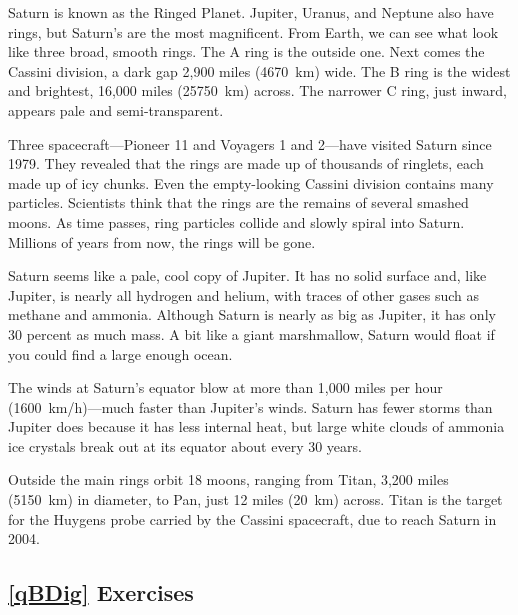 \documentclass{article}
\numberwithin{equation}{section}
\numberwithin{figure}{section}
\begin{document}
\begin{displayquote}
    Saturn is known as the Ringed Planet. Jupiter, Uranus, and Neptune also have rings, but Saturn's are the most magnificent. From Earth, we can see what look like three broad, smooth rings. The A ring is the outside one. Next comes the Cassini division, a dark gap 2,900 miles (\SI{4670}{km}) wide. The B ring is the widest and brightest, 16,000 miles (\SI{25750}{km}) across. The narrower C ring, just inward, appears pale and semi-transparent. 

    \vspace{1em}

    Three spacecraft---Pioneer 11 and Voyagers 1 and 2---have visited Saturn since 1979. They revealed that the rings are made up of thousands of ringlets, each made up of icy chunks. Even the empty-looking Cassini division contains many particles. Scientists think that the rings are the remains of several smashed moons. As time passes, ring particles collide and slowly spiral into Saturn. Millions of years from now, the rings will be gone.

    \vspace{1em}

    Saturn seems like a pale, cool copy of Jupiter. It has no solid surface and, like Jupiter, is nearly all hydrogen and helium, with traces of other gases such as methane and ammonia. Although Saturn is nearly as big as Jupiter, it has only 30 percent as much mass. A bit like a giant marshmallow, Saturn would float if you could find a large enough ocean. 

    \vspace{1em}

    The winds at Saturn's equator blow at more than 1,000 miles per hour (\SI{1600}{km/h})---much faster than Jupiter's winds. Saturn has fewer storms than Jupiter does because it has less internal heat, but large white clouds of ammonia ice crystals break out at its equator about every 30 years. 

    \vspace{1em}

    Outside the main rings orbit 18 moons, ranging from Titan, 3,200 miles (\SI{5150}{km}) in diameter, to Pan, just 12 miles (\SI{20}{km}) across. Titan is the target for the Huygens probe carried by the Cassini spacecraft, due to reach Saturn in 2004.
\end{displayquote}

\subsection*{\ref{qBDig} Exercises} 
\end{document}
